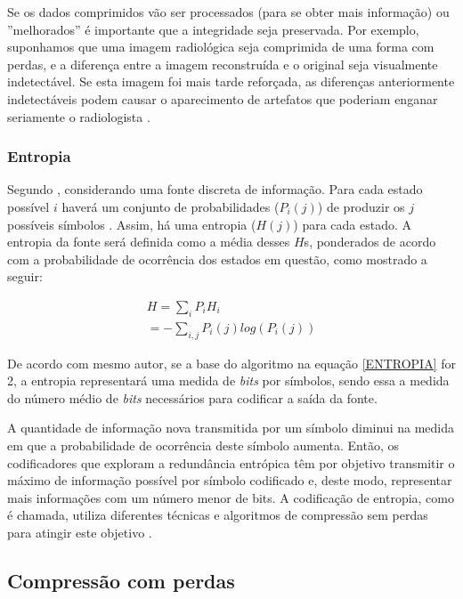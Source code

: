 Se os dados comprimidos vão ser processados (para se obter mais informação) ou ''melhorados'' é importante que a integridade seja preservada. Por exemplo, suponhamos que uma imagem radiológica seja comprimida de uma forma com perdas, e a diferença entre a imagem reconstruída e o original seja visualmente indetectável. Se esta imagem foi mais tarde reforçada, as diferenças anteriormente indetectáveis podem causar o aparecimento de artefatos que poderiam enganar seriamente o radiologista \cite{sayood2012introduction}.

\subsubsection{Entropia}

Segundo \cite{shannon2001mathematical}, considerando uma fonte discreta de informação. Para cada estado possível $i$ haverá um conjunto de probabilidades ($P_i(j)$) de produzir os $j$ possíveis símbolos . Assim, há uma entropia ($H(j)$) para cada estado. A entropia da fonte será definida como a média desses $H$s, ponderados de acordo com a probabilidade de ocorrência dos estados em questão, como mostrado a seguir:

\begin{equation}
\label{ENTROPIA}
	\begin{split}
		H = \sum_i P_iH_i\\
		= - \sum_{i,j} P_i(j) log(P_i(j))
	\end{split}
\end{equation}

De acordo com mesmo autor, se a base do algoritmo na equação \ref{ENTROPIA} for 2, a entropia representará uma medida de \textit{bits} por símbolos, sendo essa a medida do número médio de \textit{bits} necessários para codificar a saída da fonte. 

A quantidade de informação nova transmitida por um símbolo diminui na medida em que a probabilidade de ocorrência deste símbolo aumenta. Então, os codificadores que exploram a redundância entrópica têm por objetivo transmitir o máximo de informação possível por símbolo codificado e, deste modo, representar
mais informações com um número menor de bits. A codificação de entropia, como é chamada, utiliza diferentes técnicas e algoritmos de compressão sem perdas para atingir este objetivo \cite{da2007estudo}.

\subsection{Compressão com perdas}

